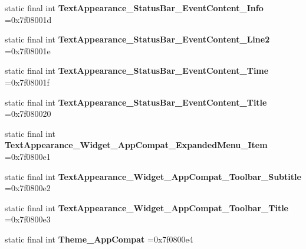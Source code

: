\begin{DoxyCompactItemize}
\item 
\hypertarget{classcheck_1_1test_1_1_r_1_1style_ae57dea12127737bd0c579ce49ac74585}{}static final int {\bfseries Text\+Appearance\+\_\+\+Status\+Bar\+\_\+\+Event\+Content\+\_\+\+Info} =0x7f08001d\label{classcheck_1_1test_1_1_r_1_1style_ae57dea12127737bd0c579ce49ac74585}

\item 
\hypertarget{classcheck_1_1test_1_1_r_1_1style_ad76d6c0cf22110970a8ff6906dd777c9}{}static final int {\bfseries Text\+Appearance\+\_\+\+Status\+Bar\+\_\+\+Event\+Content\+\_\+\+Line2} =0x7f08001e\label{classcheck_1_1test_1_1_r_1_1style_ad76d6c0cf22110970a8ff6906dd777c9}

\item 
\hypertarget{classcheck_1_1test_1_1_r_1_1style_a4c5efe3447a7513f4d30a8044ea3756d}{}static final int {\bfseries Text\+Appearance\+\_\+\+Status\+Bar\+\_\+\+Event\+Content\+\_\+\+Time} =0x7f08001f\label{classcheck_1_1test_1_1_r_1_1style_a4c5efe3447a7513f4d30a8044ea3756d}

\item 
\hypertarget{classcheck_1_1test_1_1_r_1_1style_a269da2e95392383435ba2cf570d49023}{}static final int {\bfseries Text\+Appearance\+\_\+\+Status\+Bar\+\_\+\+Event\+Content\+\_\+\+Title} =0x7f080020\label{classcheck_1_1test_1_1_r_1_1style_a269da2e95392383435ba2cf570d49023}

\item 
\hypertarget{classcheck_1_1test_1_1_r_1_1style_aee06004cbda4489560e736fb641a5126}{}static final int {\bfseries Text\+Appearance\+\_\+\+Widget\+\_\+\+App\+Compat\+\_\+\+Expanded\+Menu\+\_\+\+Item} =0x7f0800e1\label{classcheck_1_1test_1_1_r_1_1style_aee06004cbda4489560e736fb641a5126}

\item 
\hypertarget{classcheck_1_1test_1_1_r_1_1style_ab627070fc176dded436b199b070531a8}{}static final int {\bfseries Text\+Appearance\+\_\+\+Widget\+\_\+\+App\+Compat\+\_\+\+Toolbar\+\_\+\+Subtitle} =0x7f0800e2\label{classcheck_1_1test_1_1_r_1_1style_ab627070fc176dded436b199b070531a8}

\item 
\hypertarget{classcheck_1_1test_1_1_r_1_1style_abfcee5cf5c7af0f5eac8faf9b40cf38d}{}static final int {\bfseries Text\+Appearance\+\_\+\+Widget\+\_\+\+App\+Compat\+\_\+\+Toolbar\+\_\+\+Title} =0x7f0800e3\label{classcheck_1_1test_1_1_r_1_1style_abfcee5cf5c7af0f5eac8faf9b40cf38d}

\item 
\hypertarget{classcheck_1_1test_1_1_r_1_1style_a2dfbbcc147e1ebbb0c0e6909d0530a9b}{}static final int {\bfseries Theme\+\_\+\+App\+Compat} =0x7f0800e4\label{classcheck_1_1test_1_1_r_1_1style_a2dfbbcc147e1ebbb0c0e6909d0530a9b}


\end{DoxyCompactItemize}
